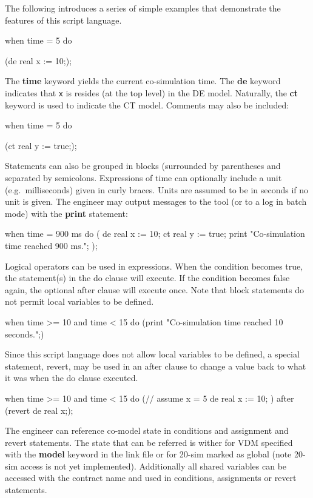 \documentclass{crescendorepchap}
\newcommand{\vdmkeyw}[1]{{\bf\ttfamily #1}}
\begin{document}
The following introduces a series of simple examples that demonstrate
the features of this script language.

\begin{dcl}
when time = 5 do

(de real x := 10;);
\end{dcl}

The \vdmkeyw{time} keyword yields the current co-simulation time. The \vdmkeyw{de}
keyword indicates that \texttt{x} is resides (at the top level) in the DE
model. Naturally, the \vdmkeyw{ct} keyword is used to indicate the CT model.
Comments may also be included:

\begin{dcl}
when time = 5 do

(ct real y := true;);
\end{dcl}

Statements can also be grouped in blocks (surrounded by parentheses and
separated by semicolons. Expressions of time can optionally include a
unit (e.g.\ milliseconds) given in curly braces. Units are assumed to be
in seconds if no unit is given. The engineer may output messages to the
tool (or to a log in batch mode) with the \vdmkeyw{print} statement:

\begin{dcl}
when time = 900 {ms} do
(
de real x := 10;
ct real y := true;
print "Co-simulation time reached 900 ms.";
);
\end{dcl}

Logical operators can be used in expressions. When the condition becomes
true, the statement(s) in the do clause will execute. If the condition
becomes false again, the optional after clause will execute once. Note
that block statements do not permit local variables to be defined.~

\begin{dcl}
when time >= 10 and time < 15 do
(print "Co-simulation time reached 10 seconds.";)
\end{dcl}

Since this script language does not allow local variables to be defined,
a special statement, revert, may be used in an after clause to change a
value back to what it was when the do clause executed.

\begin{dcl}
when time >= 10 and time < 15 do 
(// assume x = 5
 de real x := 10;
)
after (revert de real x;);
\end{dcl}

The engineer can reference co-model state in conditions and assignment
and revert statements. The state that can be referred is wither for VDM
specified with the \vdmkeyw{model} keyword in the link file or for 20-sim
marked as global (note 20-sim access is not yet implemented).
Additionally all shared variables can be accessed with the contract name
and used in conditions, assignments or revert statements.
\end{document}
